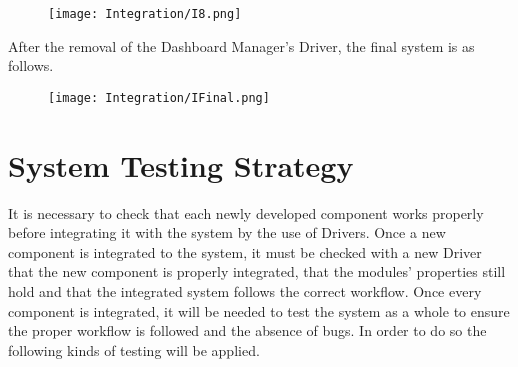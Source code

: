 \begin{figure}[H]
    \begin{center}
        \texttt{[image: Integration/I8.png]}
        \label{fig:Integration_8}%
    \end{center}
\end{figure}

After the removal of the Dashboard Manager’s Driver, the final system is as follows.

\begin{figure}[H]
    \begin{center}
        \texttt{[image: Integration/IFinal.png]}
        \label{fig:Integration_final}%
    \end{center}
\end{figure}



\section{System Testing Strategy}

It is necessary to check that each newly developed component works properly before integrating it with the system by the use of Drivers. Once a new component is integrated to the system, it must be checked with a new Driver that the new component is properly integrated, that the modules’ properties still hold and that the integrated system follows the correct workflow. 
Once every component is integrated, it will be needed to test the system as a whole to ensure the proper workflow is followed and the absence of bugs. In order to do so the following kinds of testing will be applied. 


